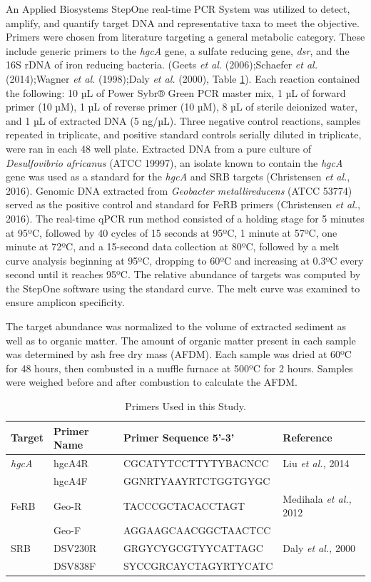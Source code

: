 \documentclass[ms, hidelinks]{uncgdissertationexp3}
\theoremstyle{plain}
\theoremstyle{definition}
\theoremstyle{remark}
\newcommand{\titlecaption}[2]{\caption[#1]{#1. #2}}
\begin{document}
An Applied Biosystems StepOne real-time PCR System was utilized to detect, amplify, and quantify target DNA and representative taxa to meet the objective. Primers were chosen from literature targeting a general metabolic category. These include generic primers to the \emph{hgcA} gene, a sulfate reducing gene, \emph{dsr}, and the 16S rDNA of iron reducing bacteria. (Geets \emph{et al.} (2006);Schaefer \emph{et al.} (2014);Wagner \emph{et al.} (1998);Daly \emph{et al.} (2000), Table \ref{tab:primers}). Each reaction contained the following: 10 µL of Power Sybr® Green PCR master mix, 1 µL of forward primer (10 µM), 1 µL of reverse primer (10 µM), 8 µL of sterile deionized water, and 1 µL of extracted DNA (5 ng/µL). Three negative control reactions, samples repeated in triplicate, and positive standard controls serially diluted in triplicate, were ran in each 48 well plate. Extracted DNA from a pure culture of \emph{Desulfovibrio africanus} (ATCC 19997), an isolate known to contain the \emph{hgcA} gene was used as a standard for the \emph{hgcA} and SRB targets (Christensen \emph{et al.}, 2016). Genomic DNA extracted from \emph{Geobacter metallireducens} (ATCC 53774) served as the positive control and standard for FeRB primers (Christensen \emph{et al.}, 2016). The real-time qPCR run method consisted of a holding stage for 5 minutes at 95ºC, followed by 40 cycles of 15 seconds at 95ºC, 1 minute at 57ºC, one minute at 72ºC, and a 15-second data collection at 80ºC, followed by a melt curve analysis beginning at 95ºC, dropping to 60ºC and increasing at 0.3ºC every second until it reaches 95ºC. The relative abundance of targets was computed by the StepOne software using the standard curve. The melt curve was examined to ensure amplicon specificity.

The target abundance was normalized to the volume of extracted sediment as well as to organic matter. The amount of organic matter present in each sample was determined by ash free dry mass (AFDM). Each sample was dried at 60ºC for 48 hours, then combusted in a muffle furnace at 500ºC for 2 hours. Samples were weighed before and after combustion to calculate the AFDM.

\begin{table}[htbp]
  \titlecaption{ Primers Used in this Study}{}\label{tab:primers}
  \centering
  \begin{tabular}{llll}
  \toprule
  Target & Primer Name & Primer Sequence 5’-3’ & Reference\\
  \midrule
  \em{hgcA} & hgcA4R & CGCATYTCCTTYTYBACNCC & Liu \emph{et al.,} 2014\\
   & hgcA4F & GGNRTYAAYRTCTGGTGYGC & \\
  FeRB & Geo-R & TACCCGCTACACCTAGT & Medihala \emph{et al.,} 2012\\
   & Geo-F & AGGAAGCAACGGCTAACTCC & \\
  SRB & DSV230R & GRGYCYGCGTYYCATTAGC & Daly \emph{et al.,} 2000\\
   & DSV838F & SYCCGRCAYCTAGYRTYCATC & \\
  \bottomrule
  \end{tabular}
  \vspace{12pt}
\end{table}
\end{document}
